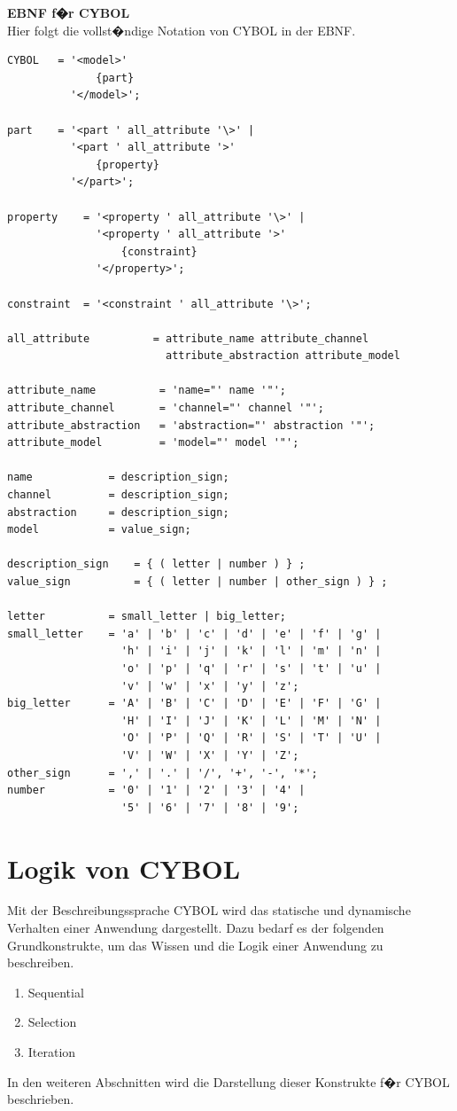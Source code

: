       \textbf{EBNF f�r CYBOL} \\
      Hier folgt die vollst�ndige Notation von CYBOL in der EBNF. 
\begin{verbatim}
CYBOL   = '<model>' 
              {part}
          '</model>';
          
part    = '<part ' all_attribute '\>' |
          '<part ' all_attribute '>'
              {property}
          '</part>';

property    = '<property ' all_attribute '\>' |
              '<property ' all_attribute '>'
                  {constraint}
              '</property>';

constraint  = '<constraint ' all_attribute '\>';

all_attribute          = attribute_name attribute_channel 
                         attribute_abstraction attribute_model

attribute_name          = 'name="' name '"';
attribute_channel       = 'channel="' channel '"';
attribute_abstraction   = 'abstraction="' abstraction '"';
attribute_model         = 'model="' model '"';

name            = description_sign;
channel         = description_sign;
abstraction     = description_sign;
model           = value_sign;

description_sign    = { ( letter | number ) } ;
value_sign          = { ( letter | number | other_sign ) } ;

letter          = small_letter | big_letter;
small_letter    = 'a' | 'b' | 'c' | 'd' | 'e' | 'f' | 'g' |
                  'h' | 'i' | 'j' | 'k' | 'l' | 'm' | 'n' |
                  'o' | 'p' | 'q' | 'r' | 's' | 't' | 'u' |
                  'v' | 'w' | 'x' | 'y' | 'z';
big_letter      = 'A' | 'B' | 'C' | 'D' | 'E' | 'F' | 'G' |
                  'H' | 'I' | 'J' | 'K' | 'L' | 'M' | 'N' |
                  'O' | 'P' | 'Q' | 'R' | 'S' | 'T' | 'U' |
                  'V' | 'W' | 'X' | 'Y' | 'Z';     
other_sign      = ',' | '.' | '/', '+', '-', '*';                  
number          = '0' | '1' | '2' | '3' | '4' | 
                  '5' | '6' | '7' | '8' | '9';   
\end{verbatim}

  \section{Logik von CYBOL}
  
    Mit der Beschreibungssprache CYBOL wird das statische und dynamische Verhalten 
    einer Anwendung dargestellt. Dazu bedarf es der folgenden Grundkonstrukte, um 
    das Wissen und die Logik einer Anwendung zu beschreiben.
    \begin{enumerate}
      \item Sequential
      \item Selection
      \item Iteration
    \end{enumerate}
    In den weiteren Abschnitten wird die Darstellung dieser Konstrukte 
    f�r CYBOL beschrieben.
    
